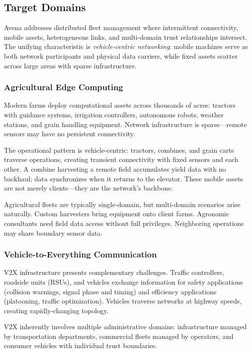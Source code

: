 \documentclass[journal]{IEEEtran}
\begin{document}
\subsection{Target Domains}

Avena addresses distributed fleet management where intermittent connectivity, mobile assets, heterogeneous links, and multi-domain trust relationships intersect. The unifying characteristic is \emph{vehicle-centric networking}: mobile machines serve as both network participants and physical data carriers, while fixed assets scatter across large areas with sparse infrastructure.

\subsubsection{Agricultural Edge Computing}

Modern farms deploy computational assets across thousands of acres: tractors with guidance systems, irrigation controllers, autonomous robots, weather stations, and grain handling equipment. Network infrastructure is sparse---remote sensors may have no persistent connectivity.

The operational pattern is vehicle-centric: tractors, combines, and grain carts traverse operations, creating transient connectivity with fixed sensors and each other. A combine harvesting a remote field accumulates yield data with no backhaul; data synchronizes when it returns to the elevator. These mobile assets are not merely clients---they are the network's backbone.

Agricultural fleets are typically single-domain, but multi-domain scenarios arise naturally. Custom harvesters bring equipment onto client farms. Agronomic consultants need field data access without full privileges. Neighboring operations may share boundary sensor data.

\subsubsection{Vehicle-to-Everything Communication}

V2X infrastructure presents complementary challenges. Traffic controllers, roadside units (RSUs), and vehicles exchange information for safety applications (collision warnings, signal phase and timing) and efficiency applications (platooning, traffic optimization). Vehicles traverse networks at highway speeds, creating rapidly-changing topology.

V2X inherently involves multiple administrative domains: infrastructure managed by transportation departments, commercial fleets managed by operators, and consumer vehicles with individual trust boundaries.
\end{document}
